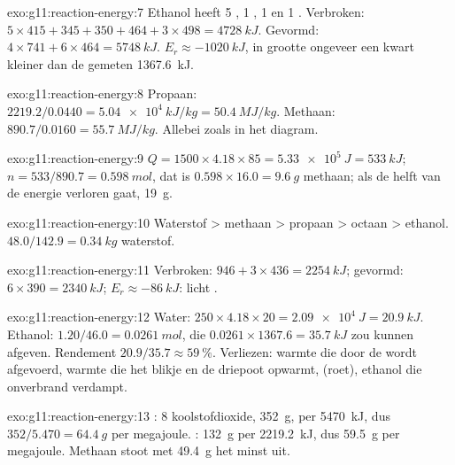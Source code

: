 \begin{solution}{exo:g11:reaction-energy:7}
Ethanol  heeft 5 , 1 , 1  en 1
. Verbroken: $5 \times 415 + 345 + 350 + 464 + 3 \times 498 =
\qty{4728}{kJ}$. Gevormd: $4 \times 741 + 6 \times 464 = \qty{5748}{kJ}$.
$E_r \approx \qty{-1020}{kJ}$, in grootte ongeveer een kwart kleiner dan
de gemeten \qty{1367.6}{kJ}.
\end{solution}

\begin{solution}{exo:g11:reaction-energy:8}
Propaan: $2219.2 / 0.0440 = \qty{5.04e4}{kJ/kg} = \qty{50.4}{MJ/kg}$.
Methaan: $890.7 / 0.0160 = \qty{55.7}{MJ/kg}$. Allebei zoals in het
diagram.
\end{solution}

\begin{solution}{exo:g11:reaction-energy:9}
$Q = 1500 \times 4.18 \times 85 = \qty{5.33e5}{J} = \qty{533}{kJ}$;
$n = 533 / 890.7 = \qty{0.598}{mol}$, dat is $0.598 \times 16.0 =
\qty{9.6}{g}$ methaan; als de helft van de energie verloren gaat,
\qty{19}{g}.
\end{solution}

\begin{solution}{exo:g11:reaction-energy:10}
Waterstof > methaan > propaan > octaan > ethanol.
$48.0 / 142.9 = \qty{0.34}{kg}$ waterstof.
\end{solution}

\begin{solution}{exo:g11:reaction-energy:11}
Verbroken: $946 + 3 \times 436 = \qty{2254}{kJ}$; gevormd:
$6 \times 390 = \qty{2340}{kJ}$; $E_r \approx \qty{-86}{kJ}$: licht
.
\end{solution}

\begin{solution}{exo:g11:reaction-energy:12}
Water: $250 \times 4.18 \times 20 = \qty{2.09e4}{J} = \qty{20.9}{kJ}$.
Ethanol: $1.20 / 46.0 = \qty{0.0261}{mol}$, die
$0.0261 \times 1367.6 = \qty{35.7}{kJ}$ zou kunnen afgeven. Rendement
$20.9 / 35.7 \approx \qty{59}{\percent}$. Verliezen: warmte die door de
 wordt afgevoerd, warmte die het blikje en de driepoot opwarmt,
 (roet), ethanol die onverbrand verdampt.
\end{solution}

\begin{solution}{exo:g11:reaction-energy:13}
: 8  koolstofdioxide,
\qty{352}{g}, per \qty{5470}{kJ}, dus $352 / 5.470 = \qty{64.4}{g}$ per
megajoule. : \qty{132}{g} per
\qty{2219.2}{kJ}, dus \qty{59.5}{g} per megajoule. Methaan stoot met
\qty{49.4}{g} het minst uit.
\end{solution}


